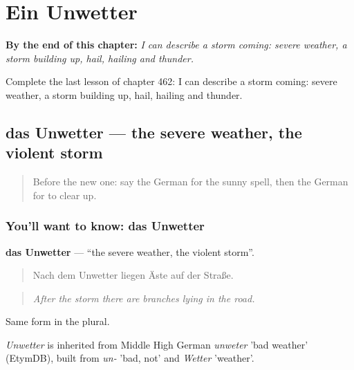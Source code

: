 
\chapter{Ein Unwetter}
\label{ch:ge-ein-unwetter}

\begin{chapteropening}
\textbf{By the end of this chapter:} \emph{I can describe a storm coming: severe weather, a storm building up, hail, hailing and thunder.}

Complete the last lesson of chapter 462: I can describe a storm coming: severe weather, a storm building up, hail, hailing and thunder.
\end{chapteropening}

\section[das Unwetter]{das Unwetter — the severe weather, the violent storm}

\label{lesson:GE-C462-unwetter}



\begin{quote}
Before the new one: say the German for the sunny spell, then the German for to clear up.
\end{quote}

\subsection*{You'll want to know: das Unwetter}
\textbf{das Unwetter} — \textquotedblleft{}the severe weather, the violent storm\textquotedblright{}.

\begin{quote}
Nach dem Unwetter liegen Äste auf der Straße.
\end{quote}

\begin{quote}
\emph{After the storm there are branches lying in the road.}
\end{quote}

Same form in the plural.

\begin{cousinweb}
\emph{Unwetter} is inherited from Middle High German \emph{unweter} 'bad weather' (EtymDB), built from \emph{un-} 'bad, not' and \emph{Wetter} 'weather'.
\end{cousinweb}

